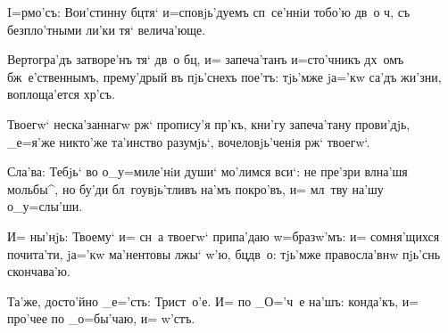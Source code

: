 
I=рмо'съ: Вои'стинну бц тя` и=сповjь'дуемъ 
сп~се'ннiи тобо'ю дв~о ч, съ безпло'тными ли'ки тя` 
велича'юще.

Вертогра'дъ затворе'нъ тя` дв~о бц, и= запеча'танъ 
и=сто'чникъ дх~омъ бж~е'ственнымъ, прему'дрый въ 
пjь'снехъ пое'тъ: тjь'мже jа='кw са'дъ жи'зни, 
воплоща'ется хр'съ.

Твоегw` неска'заннагw рж` пропису'я пр'къ, 
кни'гу запеча'тану прови'дjь, _е=я'же никто'же та'инство 
разумjь`, вочеловjь'ченiя рж` твоегw`.

Сла'ва: Тебjь` во о_у=миле'нiи души` мо'лимся вси`: не 
пре'зри вл на'шя мольбы^, но бу'ди бл~гоувjь'тливъ 
на'мъ покро'въ, и= мл~тву на'шу о_у=слы'ши.

И= ны'нjь: Твоему` и= сн~а твоегw` припа'даю 
w=бразw'мъ: и= сомня'щихся почита'ти, jа='кw ма'нентовы 
лжы` w'ю, бц дв~о: тjь'мже правосла'внw пjь'снь 
скончава'ю.

Та'же, досто'йно _е='сть: Трист~о'е. И= по _О='ч~е 
на'шъ: конда'къ, и= про'чее по _о=бы'чаю, и= w'стъ.
